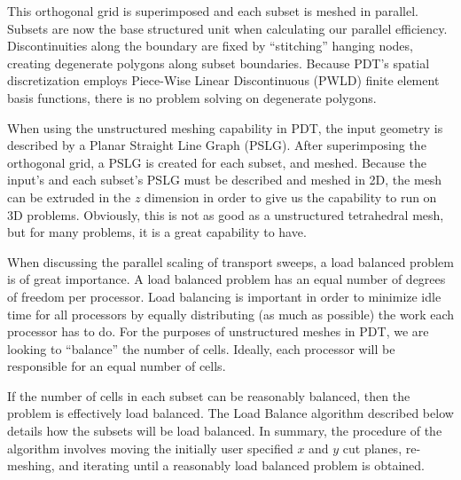 \documentclass[11pt, letterpaper,titlepage,oneside]{article}
\begin{document}
This orthogonal grid is superimposed and each subset is meshed in parallel.  Subsets are now the base structured unit when calculating our parallel efficiency. Discontinuities along the boundary are fixed by ``stitching'' hanging nodes, creating degenerate polygons along subset boundaries. Because PDT's spatial discretization employs Piece-Wise Linear Discontinuous (PWLD) finite element basis functions, there is no problem solving on degenerate polygons. 

When using the unstructured meshing capability in PDT, the input geometry is described by a Planar Straight Line Graph (PSLG). After superimposing the orthogonal grid, a PSLG is created for each subset, and meshed. Because the input's and each subset's PSLG must be described and meshed in 2D, the mesh can be extruded in the $z$ dimension in order to give us the capability to run on 3D problems. Obviously, this is not as good as a unstructured tetrahedral mesh, but for many problems, it is a great capability to have. 

When discussing the parallel scaling of transport sweeps, a load balanced problem is of great importance. A load balanced problem has an equal number of degrees of freedom per processor. Load balancing is important in order to minimize idle time for all processors by equally distributing (as much as possible) the work each processor has to do.  For the purposes of unstructured meshes in PDT, we are looking to ``balance'' the number of cells. Ideally, each processor will be responsible for an equal number of cells. 

If the number of cells in each subset can be reasonably balanced, then the problem is effectively load balanced. The Load Balance algorithm described below details how the subsets will be load balanced. In summary, the procedure of the algorithm involves moving the initially user specified $x$ and $y$ cut planes, re-meshing, and iterating until a reasonably load balanced problem is obtained. 
\end{document}
